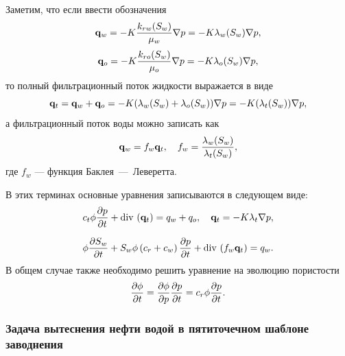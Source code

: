 Заметим, что если ввести обозначения
\begin{equation}
    \mathbf{q}_w = -K\frac{k_{rw}(S_w)}{\mu_w}\nabla p = -K \lambda_w(S_w) \nabla p,
\end{equation}
\begin{equation}
	\mathbf{q}_o = -K\frac{k_{ro}(S_w)}{\mu_o}\nabla p = -K \lambda_o(S_w) \nabla p,
\end{equation}
то полный фильтрационный поток жидкости выражается в виде
\begin{equation}
    \mathbf{q}_t = \mathbf{q}_w + \mathbf{q}_o = -K (\lambda_w(S_w) + \lambda_o(S_w)) \nabla p = -K (\lambda_t(S_w)) \nabla p,
\end{equation}
а фильтрационный поток воды можно записать как 
\begin{equation}
    \mathbf{q}_w = f_w \mathbf{q}_t, \quad f_w  = \dfrac{\lambda_w(S_w)}{\lambda_t(S_w)},
\end{equation}
где $f_w$ --- функция Баклея~---~Леверетта.

В этих терминах основные уравнения записываются в следующем виде:
\begin{equation}\label{eq:diffusion}
    c_t\phi \dfrac{\partial p}{\partial t}
    + \operatorname{div}\, \left( \mathbf{q}_t \right) = q_w + q_o, \quad \mathbf{q}_t = - K \lambda_t \nabla p,
\end{equation}



\begin{equation}\label{eq:satur}
	\phi \dfrac{\partial S_w}{\partial t} + S_w\phi\left(c_r + c_w \right)\dfrac{\partial p}{\partial t} + \operatorname{div}\, \left( f_w \mathbf{q}_t \right) = 
	q_w.
\end{equation}
В общем случае также необходимо решить уравнение на эволюцию пористости
\begin{equation}\label{eq:porosity_evolution}
	\dfrac{\partial \phi}{\partial t} = \dfrac{\partial \phi}{\partial p} \dfrac{\partial p}{\partial t}  = c_r \phi \dfrac{\partial p}{\partial t}.
\end{equation}

\subsubsection{Задача вытеснения нефти водой в пятиточечном шаблоне заводнения}

